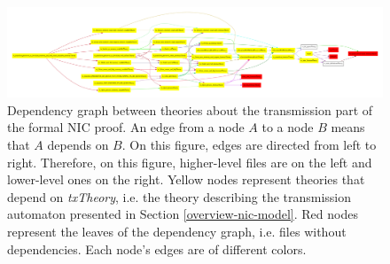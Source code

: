 \documentclass{kththesis}
\begin{document}
{\begin{figure}[p]
	\includegraphics[width=\textwidth]{figures/depgraph-nic-tx-files.pdf}
	\centering
	\caption{Dependency graph between theories about the transmission part of the formal NIC proof. An edge from a node $A$ to a node $B$ means that $A$ depends on $B$. On this figure, edges are directed from left to right. Therefore, on this figure, higher-level files are on the left and lower-level ones on the right. Yellow nodes represent theories that depend on \textit{txTheory}, i.e. the theory describing the transmission automaton presented in Section \ref{overview-nic-model}. Red nodes represent the leaves of the dependency graph, i.e. files without dependencies. Each node's edges are of different colors.}
	\label{depgraph-nic-tx-files}
\end{figure}

}
\end{document}
